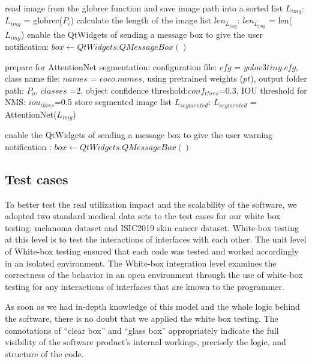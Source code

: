 {\begin{algorithm}[t]
\begin{algorithmic}[1]
    \Else
      \State  read image from the globrec function and save image path into a sorted list $L_{img}$: $L_{img}$ = globrec($P_{i}$)
      \State  calculate the length of the image list $len_{L_{img}}$: $len_{L_{img}}$ = len($L_{img}$)
      \State  enable the QtWidgets of sending a message box to give the user notification: $box  \gets QtWidgets.QMessageBox()$
    
      \State  prepare for AttentionNet segmentation: \newline configuration file: $cfg$ = $yolov3tiny.cfg$, class name file: $names$ = $coco.names$, using pretrained weights ($pt$), output folder path: $P_{o}$, $classes$ =2, object confidence threshold:$conf_{thres}$=0.3, IOU threshold for NMS: $iou_{thres}$=0.5
      \State  store segmented image list $L_{segmented}$: $L_{segmented}$ = AttentionNet($L_{img}$)
      
      \State  enable the QtWidgets of sending a message box to give the user warning notification : $box  \gets QtWidgets.QMessageBox()$
      
    \EndIf \newline
  \end{algorithmic}
\end{algorithm}



\subsection{Test cases} %
\label{sub:amet}

To better test the real utilization impact and the scalability of the software, we adopted two standard medical data sets to the test cases for our white box testing: melanoma dataset and ISIC2019 skin cancer dataset.
White-box testing at this level is to test the interactions of interfaces with each other. The unit level of White-box testing ensured that each code was tested and worked accordingly in an isolated environment. The White-box integration level examines the correctness of the behavior in an open environment through the use of white-box testing for any interactions of interfaces that are known to the programmer.

As soon as we had in-depth knowledge of this model and the whole logic behind the software, there is no doubt that we applied the white box testing.
The connotations of “clear box” and “glass box” appropriately indicate the full visibility of the software product's internal workings, precisely the logic, and structure of the code. 






}
